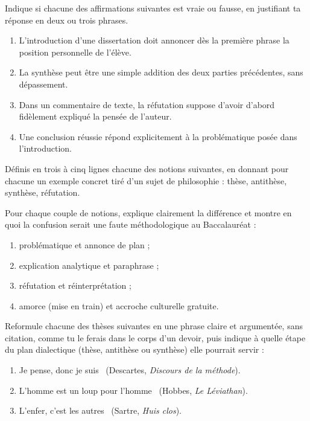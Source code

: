 \documentclass[11pt]{article}
\newcommand{\cle}[1]{{\popxbold\color{popdark}#1}}
\newcounter{popsec}
\newcounter{popsub}
\newcommand{\courssub}[1]{%
  \stepcounter{popsub}%
  \par\vspace{9pt}\noindent{\popxbold\fontsize{11.5}{13}\selectfont\color{popink}{\color{poporange}\thepopsec.\thepopsub}\hspace{6pt}#1}\par\nopagebreak\vspace{4pt}
}
\begin{document}
\begin{exercice}
Indique si chacune des affirmations suivantes est vraie ou fausse, en justifiant ta réponse en deux ou trois phrases.
\begin{enumerate}
\item L'introduction d'une dissertation doit annoncer dès la première phrase la position personnelle de l'élève.
\item La synthèse peut être une simple addition des deux parties précédentes, sans dépassement.
\item Dans un commentaire de texte, la réfutation suppose d'avoir d'abord fidèlement expliqué la pensée de l'auteur.
\item Une conclusion réussie répond explicitement à la problématique posée dans l'introduction.
\end{enumerate}
\end{exercice}

\begin{exercice}
Définis en trois à cinq lignes chacune des notions suivantes, en donnant pour chacune un exemple concret tiré d'un sujet de philosophie : \cle{thèse}, \cle{antithèse}, \cle{synthèse}, \cle{réfutation}.
\end{exercice}

\begin{exercice}
Pour chaque couple de notions, explique clairement la différence et montre en quoi la confusion serait une faute méthodologique au Baccalauréat :
\begin{enumerate}
\item problématique et annonce de plan ;
\item explication analytique et paraphrase ;
\item réfutation et réinterprétation ;
\item amorce (mise en train) et accroche culturelle gratuite.
\end{enumerate}
\end{exercice}

\courssub{Je m'entraîne}

\begin{exercice}
Reformule chacune des thèses suivantes en une phrase claire et argumentée, sans citation, comme tu le ferais dans le corps d'un devoir, puis indique à quelle étape du plan dialectique (thèse, antithèse ou synthèse) elle pourrait servir :
\begin{enumerate}
\item \guillemotleft Je pense, donc je suis \guillemotright\ (Descartes, \emph{Discours de la méthode}).
\item \guillemotleft L'homme est un loup pour l'homme \guillemotright\ (Hobbes, \emph{Le Léviathan}).
\item \guillemotleft L'enfer, c'est les autres \guillemotright\ (Sartre, \emph{Huis clos}).
\end{enumerate}
\end{exercice}
\end{document}
